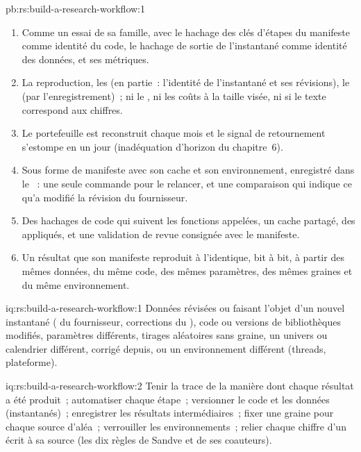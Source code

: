 \begin{solution}{pb:rs:build-a-research-workflow:1}
\begin{enumerate}
\item Comme un essai de sa famille, avec le hachage des clés d'étapes du manifeste comme identité du code, le hachage de sortie de l'instantané comme identité des données, et ses
métriques.
\item La reproduction, les  (en partie~: l'identité de l'instantané et ses révisions), le  (par l'enregistrement)~; ni le ,
ni les coûts à la taille visée, ni si le texte correspond aux chiffres.
\item Le portefeuille est reconstruit chaque mois et le signal de retournement s'estompe en un jour (inadéquation d'horizon du chapitre~6).
\item Sous forme de manifeste avec son cache et son environnement, enregistré dans le ~: une seule commande pour le relancer, et une comparaison qui indique ce qu'a modifié la révision du fournisseur.
\item Des hachages de code qui suivent les fonctions appelées, un cache partagé, des  appliqués, et une validation de revue consignée avec le manifeste.
\item Un résultat que son manifeste reproduit à l'identique, bit à bit, à partir des mêmes données, du même code, des mêmes paramètres, des mêmes graines et du même environnement.
\end{enumerate}
\end{solution}

\begin{solution}{iq:rs:build-a-research-workflow:1}
Données révisées ou faisant l'objet d'un nouvel instantané ( du fournisseur, corrections du ), code ou versions de bibliothèques modifiés, paramètres différents, tirages aléatoires sans graine, un
univers ou calendrier différent,  corrigé depuis, ou un environnement différent (threads, plateforme).
\end{solution}

\begin{solution}{iq:rs:build-a-research-workflow:2}
Tenir la trace de la manière dont chaque résultat a été produit~; automatiser chaque étape~; versionner le code et les données (instantanés)~; enregistrer les résultats intermédiaires~; fixer une graine pour chaque source d'aléa~; verrouiller
les environnements~; relier chaque chiffre d'un écrit à sa source (les dix règles de Sandve et de ses coauteurs).
\end{solution}

